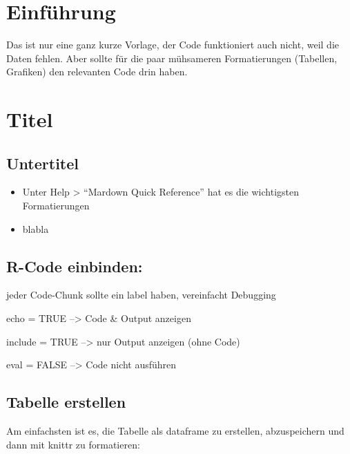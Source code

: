 \documentclass[
  11pt,
]{article}
\begin{document}
{
\setcounter{tocdepth}{2}
\tableofcontents
}
\newpage

\hypertarget{einfuxfchrung}{%
\section{Einführung}\label{einfuxfchrung}}

Das ist nur eine ganz kurze Vorlage, der Code funktioniert auch nicht, weil die Daten fehlen. Aber sollte für die paar mühsameren Formatierungen (Tabellen, Grafiken) den relevanten Code drin haben.

\hypertarget{titel}{%
\section{Titel}\label{titel}}

\hypertarget{untertitel}{%
\subsection{Untertitel}\label{untertitel}}

\begin{itemize}
\item
  Unter Help \textgreater{} ``Mardown Quick Reference'' hat es die wichtigsten Formatierungen
\item
  blabla
\end{itemize}

\hypertarget{r-code-einbinden}{%
\subsection{R-Code einbinden:}\label{r-code-einbinden}}

jeder Code-Chunk sollte ein label haben, vereinfacht Debugging

echo = TRUE --\textgreater{} Code \& Output anzeigen

include = TRUE --\textgreater{} nur Output anzeigen (ohne Code)

eval = FALSE --\textgreater{} Code nicht ausführen

\hypertarget{tabelle-erstellen}{%
\subsection{Tabelle erstellen}\label{tabelle-erstellen}}

Am einfachsten ist es, die Tabelle als dataframe zu erstellen, abzuspeichern und dann mit knittr zu formatieren:
\end{document}
